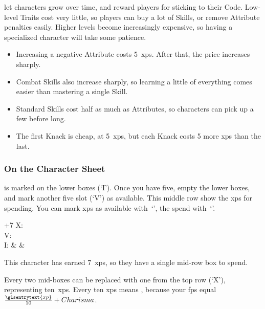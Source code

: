\begin{multicols}{2}

\noindent
{} let characters grow over time, and reward players for sticking to their Code.
Low-level Traits cost very little, so players can buy a lot of Skills, or remove Attribute penalties easily.
Higher levels become increasingly expensive, so having a specialized character will take some patience.

\begin{itemize}
  \item
  Increasing a negative Attribute costs 5~\glspl{xp}.
  After that, the price increases sharply.
  \item
  Combat Skills also increase sharply, so learning a little of everything comes easier than mastering a single Skill.
  \item
  Standard Skills cost half as much as Attributes, so characters can pick up a few before long.
  \item
  The first Knack is cheap, at 5~\glspl{xp}, but each Knack costs 5 more \glspl{xp} than the last.
\end{itemize}

\subsubsection{On the Character Sheet}
 is marked on the lower boxes (`I').
Once you have five, empty the lower boxes, and mark another five slot (`V') as available.
This middle row show the \glspl{xp} for spending.
You can mark \glspl{xp} as available with~`\XPboxEarned', the spend with~`\XPboxSpent'.

\begin{nametable}[rcccccccccc]{+7 }
  X: 
  \\
  V: %
  \\
  I: &   &
  \\
\end{nametable}

\begin{exampletext}
  This character has earned 7~\glspl{xp}, so they have a single mid-row box to spend.
\end{exampletext}

Every two mid-boxes can be replaced with one from the top row (`X'), representing ten~\glspl{xp}.
Every ten \glspl{xp} means , because your \glspl{fp} equal $\frac{\glsentrytext{xp}}{10} + Charisma$.


\end{multicols}
